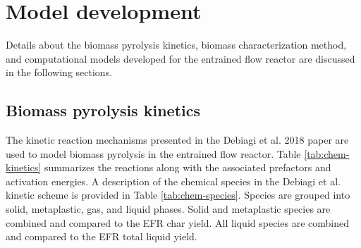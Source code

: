 
\section{Model development}

Details about the biomass pyrolysis kinetics, biomass characterization method, and computational models developed for the entrained flow reactor are discussed in the following sections.

\subsection{Biomass pyrolysis kinetics}

The kinetic reaction mechanisms presented in the Debiagi et al. 2018 paper \cite{Debiagi-2018} are used to model biomass pyrolysis in the entrained flow reactor. Table \ref{tab:chem-kinetics} summarizes the reactions along with the associated prefactors and activation energies. A description of the chemical species in the Debiagi et al. kinetic scheme is provided in Table \ref{tab:chem-species}. Species are grouped into solid, metaplastic, gas, and liquid phases. Solid and metaplastic species are combined and compared to the EFR char yield. All liquid species are combined and compared to the EFR total liquid yield.

